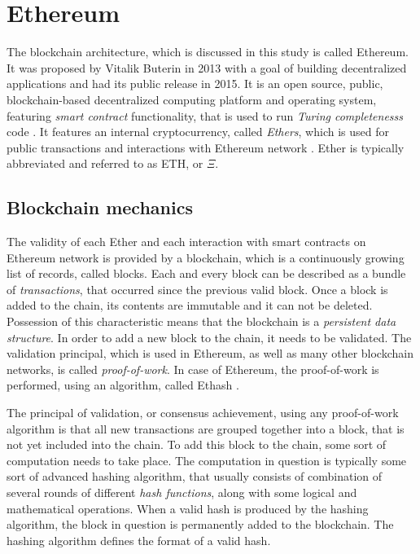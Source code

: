 \appendix

\section{Ethereum} \label{section:ether}

The blockchain architecture, which is discussed in this study is called Ethereum. It was proposed by Vitalik Buterin in 2013 with a goal of building decentralized applications and had its public release in 2015. It is an open source, public, blockchain-based decentralized computing platform and operating system, featuring \emph{\gls{smart contract}} functionality, that is used to run \emph{\glspl{Turing completeness}} code \citep{ethereumturing}. It features an internal cryptocurrency, called \emph{\glspl{Ether}}, which is used for public transactions and interactions with Ethereum network \citep{ether}. Ether is typically abbreviated and referred to as ETH, or $\Xi$.

\subsection*{Blockchain mechanics}
The validity of each Ether and each interaction with smart contracts on Ethereum network is provided by a blockchain, which is a continuously growing list of records, called blocks. Each and every block can be described as a bundle of \emph{\glspl{transaction}}, that occurred since the previous valid block. Once a block is added to the chain, its contents are immutable and it can not be deleted. Possession of this characteristic means that the blockchain is a \emph{\gls{persistent data structure}}. In order to add a new block to the chain, it needs to be validated. The validation principal, which is used in Ethereum, as well as many other blockchain networks, is called \emph{\gls{proof-of-work}}. In case of Ethereum, the proof-of-work is performed, using an algorithm, called Ethash \citep{ethash}. 

The principal of validation, or consensus achievement, using any proof-of-work algorithm is that all new transactions are grouped together into a block, that is not yet included into the chain. To add this block to the chain, some sort of computation needs to take place. The computation in question is typically some sort of advanced hashing algorithm, that usually consists of combination of several rounds of different \emph{\glspl{hash function}}, along with some logical and mathematical operations. When a valid hash is produced by the hashing algorithm, the block in question is permanently added to the blockchain. The hashing algorithm defines the format of a valid hash. 

